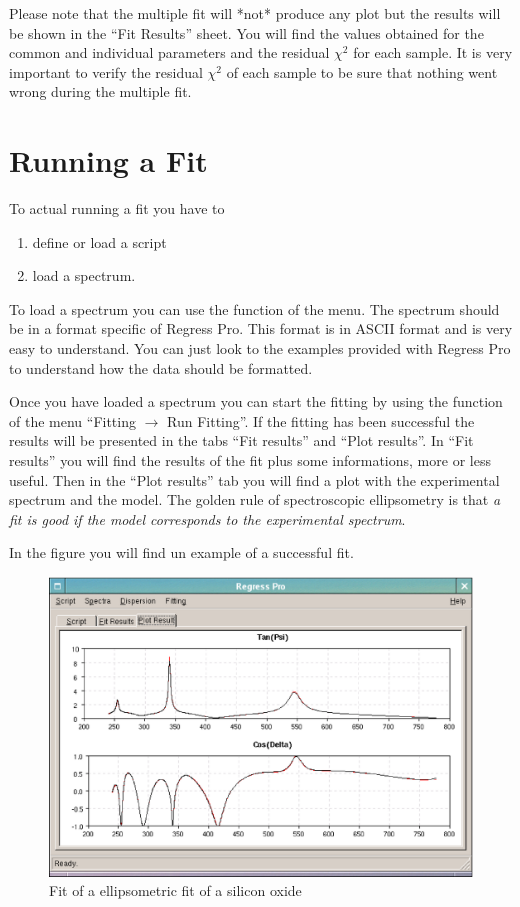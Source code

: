 \documentclass[a4paper]{report}
\begin{document}
Please note that the multiple fit will *not* produce any plot but the results will be shown in the ``Fit Results'' sheet.
You will find the values obtained for the common and individual parameters and the residual $\chi^2$ for each sample.
It is very important to verify the residual $\chi^2$ of each sample to be sure that nothing went wrong during the multiple fit.

\chapter{Running a Fit}
To actual running a fit you have to
\begin{enumerate}
  \item define or load a script
  \item load a spectrum.
\end{enumerate}
To load a spectrum you can use the function of the menu. The spectrum
should be in a format specific of Regress Pro. This format is in ASCII
format and is very easy to understand. You can just look to the
examples provided with Regress Pro to understand how the data should
be formatted.

Once you have loaded a spectrum you can start the fitting by using the
function of the menu ``\textsf{Fitting $\rightarrow$ Run Fitting}''. If the
fitting has been successful the results will be presented in the tabs
``Fit results'' and ``Plot results''. In ``Fit results'' you will find
the results of the fit plus some informations, more or less
useful. Then in the ``Plot results'' tab you will find a plot with the
experimental spectrum and the model. The golden rule of spectroscopic
ellipsometry is that \emph{a fit is good if the model corresponds to
the experimental spectrum}.

In the figure you will find un example of a successful fit.
\begin{figure}[!thp]
  \includegraphics[width=\textwidth]{figure/oxide-fit-1.eps}
  \caption{Fit of a ellipsometric fit of a silicon oxide}
\end{figure}
\end{document}
